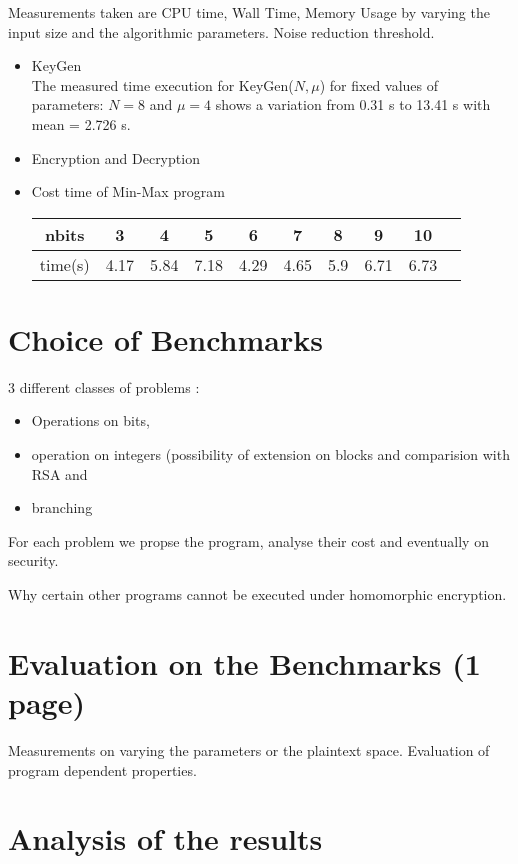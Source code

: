 \documentclass{acm_proc_article-sp}
\begin{document}
Measurements taken are CPU time, Wall Time, Memory Usage by varying the input size  and the algorithmic parameters. Noise reduction threshold.
\begin{itemize}
\item KeyGen\\
The measured time execution for KeyGen($N, \mu$)  for fixed values of parameters: $N=8$ and $\mu = 4$ shows a variation from 0.31 s to 13.41 s with mean = 2.726 s.\\
\item {Encryption and Decryption}\\


\item {Cost time of Min-Max program}\\
\begin{tabular}{|c|c|c|c|c|c|c|c|c|c|}
  \hline
  nbits  & 3 & 4 & 5 & 6 & 7 & 8 &  9  & 10 \\
  \hline
  time(s) & 4.17 & 5.84 & 7.18 & 4.29 & 4.65 & 5.9 & 6.71 & 6.73\\
  \hline
\end{tabular}
\end{itemize}
\section{Choice of Benchmarks}

3 different classes of problems : 
\begin{itemize}
\item Operations on bits,
 \item operation on integers (possibility of extension on blocks and comparision with RSA and 
 \item branching
\end{itemize}

For each problem we propse the program, analyse their cost and eventually on security.

Why certain other programs cannot be executed under homomorphic encryption.

\section{Evaluation on the Benchmarks (1 page)}

Measurements on varying the parameters or the plaintext space. Evaluation of program dependent properties. 

\section{Analysis of the results}
\end{document}

